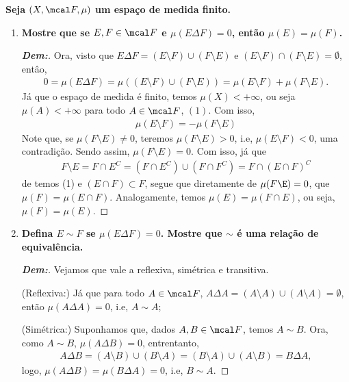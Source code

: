 \newpage 
{}
\bigline 
\textbf{Seja $(X, \mcal F, \mu)$ um espaço de medida finito.} 
\begin{enumerate}[label=(\alph*), wide, labelindent=0pt]
  \item \textbf{Mostre que se $E, F \in \mcal F$ e $\mu(E \Delta F) = 0$, 
    então $\mu(E) = \mu(F)$.}
    \begin{proof}[\textbf{Dem:}] Ora, visto que 
      $E \Delta F = (E \setminus F) \cup (F \setminus E)$ e 
      $(E\setminus F)\cap (F \setminus E) = \emptyset$, entâo, 
      \begin{align*}
        0 = \mu(E\Delta F) = \mu((E \setminus F) \cup (F \setminus E))
        = \mu(E\setminus F) + \mu(F\setminus E).
      \end{align*}
      Já que o espaço de medida é finito, temos $\mu(X)<+\infty$, ou seja $\mu(A) < +\infty$
      para todo $A \in \mcal F$, $(1)$. Com isso, 
      \begin{align*}
        \mu(E\setminus F) = -\mu(F\setminus E)
      \end{align*}
      Note que, se $\mu(F\setminus E) \neq 0$, teremos $\mu(F \setminus E) > 0$, i.e, 
      $\mu(E \setminus F) < 0$, uma contradição. Sendo assim, $\mu(F \setminus E) = 0$. 
      Com isso, já que 
      \begin{align*}
        F\setminus E = F \cap E^C = (F \cap E^C) \cup (F \cap F^C) = F\cap(E \cap F)^C
      \end{align*}
      de temos (1) e $(E\cap F) \subset F$, segue que diretamente de $\mu(F\E) = 0$,
      que $\mu(F) = \mu(E \cap F)$. Analogamente, temos $\mu(E) = \mu(F \cap E)$, 
      ou seja, $\mu(F) = \mu(E)$.
  \end{proof}
  \item \textbf{Defina $E\sim F$ se $\mu(E \Delta F) = 0$. Mostre que $\sim$ é uma 
    relação de equivalência.}
    \begin{proof}[\textbf{Dem:}]
      Vejamos que vale a reflexiva, simétrica e transitiva. 
     
      \noindent
      (Reflexiva:) Já que para todo $A \in \mcal F$, $A \Delta A = (A\setminus A) \cup (A \setminus A) = \emptyset$, 
      então $\mu(A\Delta A) = 0$, i.e, $A \sim A$;
      
      \noindent 
      (Simétrica:) Suponhamos que, dados $A, B \in \mcal F$, temos $A \sim B$. Ora, como $A \sim B$, 
      $\mu(A\Delta B) = 0$, entrentanto,
      \begin{align*}
        A\Delta B = (A\setminus B) \cup (B \setminus A) = (B \setminus A) \cup (A \setminus B) = B\Delta A,
      \end{align*}
      logo, $\mu(A\Delta B) = \mu(B\Delta A) = 0$, i.e, $B \sim A$.


\end{proof}
\end{enumerate}
